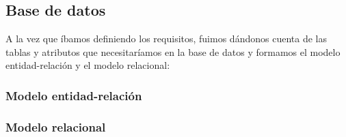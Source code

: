 \subsection{Base de datos}

A la vez que íbamos definiendo los requisitos, fuimos dándonos cuenta de las tablas y atributos que necesitaríamos en la base de datos y formamos el modelo entidad-relación y el modelo relacional:

\subsubsection{Modelo entidad-relación}
\begin{landscape}
\begin{center}
\end{center}
\end{landscape}

\subsubsection{Modelo relacional}
\begin{center}
\end{center}


